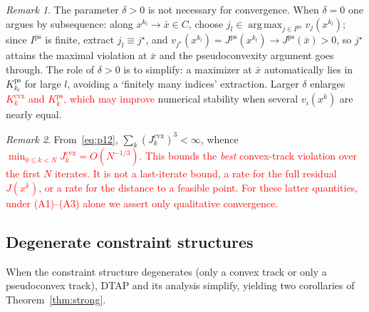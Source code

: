 \documentclass[]{interact}
\theoremstyle{plain}
\theoremstyle{definition}
\theoremstyle{remark}
\newtheorem{remark}{Remark}
\DeclareMathOperator*{\argmax}{arg\,max}
\newcommand{\cvx}{\mathrm{cvx}}
\newcommand{\ps}{\mathrm{ps}}
\newcommand{\dtap}{\textsc{DTAP}}
\begin{document}
\begin{remark}\label{rem:delta-role}
The parameter $\delta>0$ is not necessary for convergence. When $\delta=0$ one argues by
subsequence: along $x^{k_l}\to\bar x\in C$, choose
$j_l\in\argmax_{j\in I^{\ps}}v_j(x^{k_l})$; since $I^{\ps}$ is finite, extract
$j_l\equiv j^\star$, and $v_{j^\star}(x^{k_l})=J^{\ps}(x^{k_l})\to J^{\ps}(\bar x)>0$, so
$j^\star$ attains the maximal violation at $\bar x$ and the pseudoconvexity argument
goes through. The role of $\delta>0$ is to simplify: a maximizer at $\bar x$ automatically
lies in $K^{\ps}_{k_l}$ for large $l$, avoiding a `finitely many indices' extraction.
Larger $\delta$ enlarges \leavevmode\textcolor{red}{$K^{\cvx}_k$ and $K^{\ps}_k$, which may improve} numerical
stability when several $v_i(x^k)$ are nearly equal.
\end{remark}

\begin{remark}\label{rem:rate}
From~\eqref{eq:p12}, $\sum_k(J^{\cvx}_k)^3<\infty$, whence
\leavevmode\textcolor{red}{$\min_{0\le k<N}J^{\cvx}_k=O(N^{-1/3})$. This bounds the \emph{best} convex-track violation
over the first $N$ iterates. It is not a last-iterate bound, a rate for the full residual
$J(x^k)$, or a rate for the distance to a feasible point. For these latter quantities,
under (A1)--(A3) alone we assert only qualitative convergence.}
\end{remark}

\subsection{Degenerate constraint structures}\label{ssec:degenerate}
When the constraint structure degenerates (only a convex track or only a pseudoconvex
track), \dtap{} and its analysis simplify, yielding two corollaries of
Theorem~\ref{thm:strong}.
\end{document}
